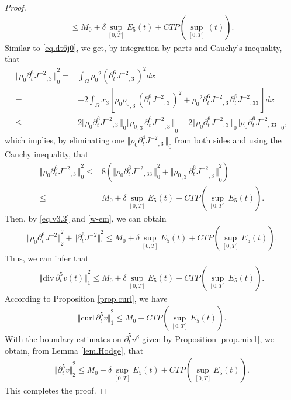 \documentclass[12pt,twoside,reqno]{amsart}
\numberwithin{equation}{section}
\theoremstyle{definition}
\theoremstyle{remark}
\begin{document}
\begin{proof}
\begin{align*}
  {\leqslant} M_0+\delta \sup_{[0,T]} E_5(t)+CTP(\sup_{[0,T]}(t)).
\end{align*}
Similar to \eqref{eq.dt6j0}, we get, by integration by parts and Cauchy's inequality, that
\begin{align*}
{\Vert{{\rho_0}  {\partial}_t^6{{{J^{-2}}}_{,{3}}\,}}\Vert}_0^2=&\int_\Omega {\rho_0}^2  ({\partial}_t^6{{{J^{-2}}}_{,{3}}\,})^2dx\\
  =&-2\int_\Omega x_3[{\rho_0}{{\rho_0}_{,{3}}\,}({\partial}_t^6{{{J^{-2}}}_{,{3}}\,})^2+{\rho_0}^2  {\partial}_t^6{{{J^{-2}}}_{,{3}}\,}{\partial}_t^6{{{J^{-2}}}_{,{33}}\,}]dx\\
  {\leqslant}& 2{\Vert{{\rho_0}  {\partial}_t^6{{{J^{-2}}}_{,{3}}\,}}\Vert}_0{\Vert{{{\rho_0}_{,{3}}\,} {{{{\partial}_t^6 J^{-2}}}_{,{3}}\,}}\Vert}_0+2{\Vert{{\rho_0}  {\partial}_t^6{{{J^{-2}}}_{,{3}}\,}}\Vert}_0{\Vert{{\rho_0}  {\partial}_t^6{{{J^{-2}}}_{,{33}}\,}}\Vert}_0,
\end{align*}
which implies, by eliminating one ${\Vert{{\rho_0}  {\partial}_t^4{{{J^{-2}}}_{,{3}}\,}}\Vert}_0$ from both sides and using the Cauchy inequality, that
\begin{align*}
  {\Vert{{\rho_0}  {\partial}_t^6{{{J^{-2}}}_{,{3}}\,}}\Vert}_0^2{\leqslant} & 8\left({\Vert{{\rho_0}  {\partial}_t^6{{{J^{-2}}}_{,{33}}\,}}\Vert}_0^2+{\Vert{{{\rho_0}_{,{3}}\,} {{{{\partial}_t^6 J^{-2}}}_{,{3}}\,}}\Vert}_0^2\right)\\
  {\leqslant}&  M_0+\delta \sup_{[0,T]} E_5(t)+CTP(\sup_{[0,T]}E_5(t)).
\end{align*}
Then, by \eqref{eq.v3.3} and \eqref{w-em}, we can obtain
\begin{align*}
  {\Vert{{\rho_0}  {\partial}_t^6 J^{-2}}\Vert}_2^2+{\Vert{{\partial}_t^6 J^{-2}}\Vert}_1^2{\leqslant} M_0+\delta \sup_{[0,T]} E_5(t)+CTP(\sup_{[0,T]}E_5(t)).
\end{align*}
Thus, we can infer that
\begin{align*}
  {\Vert{{\mathrm{div}\,} {\partial}_t^5 v(t)}\Vert}_1^2{\leqslant} M_0+\delta \sup_{[0,T]} E_5(t)+CTP(\sup_{[0,T]}E_5(t)).
\end{align*}
According to Proposition \ref{prop.curl}, we have
\begin{align*}
  {\Vert{{\mathrm{curl}\,}{\partial}_t^5 v}\Vert}_1^2{\leqslant} M_0+CTP(\sup_{[0,T]}E_5(t)).
\end{align*}
With the boundary estimates on ${\partial}_t^5 v^\beta$  given by Proposition \ref{prop.mix1}, we obtain, from Lemma \ref{lem.Hodge}, that
\begin{align*}
  {\Vert{{\partial}_t^5v}\Vert}_2^2{\leqslant} M_0+\delta \sup_{[0,T]} E_5(t)+CTP(\sup_{[0,T]}E_5(t)).
\end{align*}
This completes the proof.
\end{proof}
\end{document}
